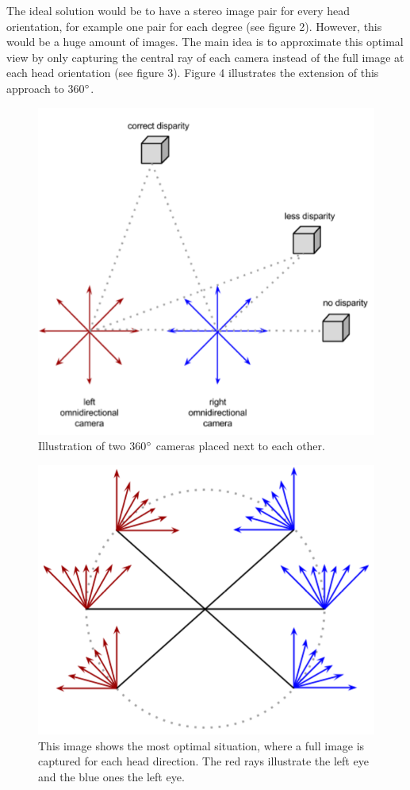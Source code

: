 \documentclass[10pt,twocolumn,letterpaper]{article}
\begin{document}
The ideal solution would be to have a stereo image pair for every head orientation, for example one pair for each degree (see figure 2). However, this would be a huge amount of images. The main idea is to approximate this optimal view by only capturing the central ray of each camera instead of the full image at each head orientation (see figure 3). Figure 4 illustrates the extension of this approach to 360$\degree$.

\begin{figure}[t]
\begin{center}
   \includegraphics[width=0.8\linewidth]{pictures/two_360.png}
\end{center}
   \caption{Illustration of two 360$\degree$ cameras placed next to each other.}
\label{fig:long}
\label{fig:onecol}
\end{figure}

\begin{figure}[t]
\begin{center}
   \includegraphics[width=0.5\linewidth]{pictures/wanted.png}
\end{center}
   \caption{This image shows the most optimal situation, where a full image is captured for each head direction. The red rays illustrate the left eye and the blue ones the left eye.}
\label{fig:long}
\label{fig:onecol}
\end{figure}
\end{document}
